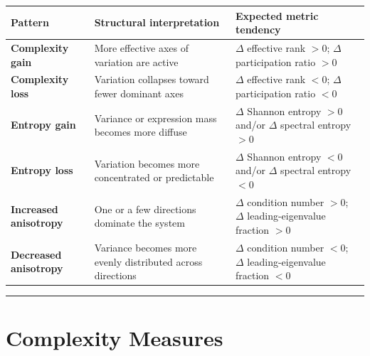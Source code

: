 \documentclass[
  letterpaper,
  DIV=11,
  numbers=noendperiod,
  openany,
  oneside]{scrreprt}
\begin{document}
\begin{longtable}[]{@{}
  >{\raggedright\arraybackslash}p{}
  >{\raggedright\arraybackslash}p{}
  >{\raggedright\arraybackslash}p{}@{}}
\toprule\noalign{}
\begin{minipage}[b]{\linewidth}\raggedright
Pattern
\end{minipage} & \begin{minipage}[b]{\linewidth}\raggedright
Structural interpretation
\end{minipage} & \begin{minipage}[b]{\linewidth}\raggedright
Expected metric tendency
\end{minipage} \\
\midrule\noalign{}
\endhead
\bottomrule\noalign{}
\endlastfoot
\textbf{Complexity gain} & More effective axes of variation are active &
\(\Delta\) effective rank \(> 0\); \(\Delta\) participation ratio
\(> 0\) \\
\textbf{Complexity loss} & Variation collapses toward fewer dominant
axes & \(\Delta\) effective rank \(< 0\); \(\Delta\) participation ratio
\(< 0\) \\
\textbf{Entropy gain} & Variance or expression mass becomes more diffuse
& \(\Delta\) Shannon entropy \(> 0\) and/or \(\Delta\) spectral entropy
\(> 0\) \\
\textbf{Entropy loss} & Variation becomes more concentrated or
predictable & \(\Delta\) Shannon entropy \(< 0\) and/or \(\Delta\)
spectral entropy \(< 0\) \\
\textbf{Increased anisotropy} & One or a few directions dominate the
system & \(\Delta\) condition number \(> 0\); \(\Delta\)
leading-eigenvalue fraction \(> 0\) \\
\textbf{Decreased anisotropy} & Variance becomes more evenly distributed
across directions & \(\Delta\) condition number \(< 0\); \(\Delta\)
leading-eigenvalue fraction \(< 0\) \\
\end{longtable}

\begin{center}\rule{0.5\linewidth}{0.5pt}\end{center}

\section{Complexity Measures}\label{complexity-measures}
\end{document}

